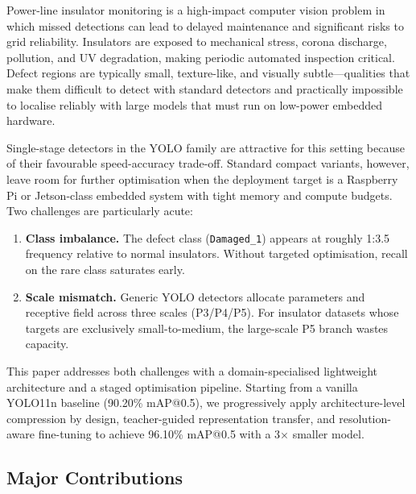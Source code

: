 \documentclass[11pt,a4paper]{article}
\begin{document}
Power-line insulator monitoring is a high-impact computer vision problem in which missed
detections can lead to delayed maintenance and significant risks to grid reliability.
Insulators are exposed to mechanical stress, corona discharge, pollution, and UV
degradation, making periodic automated inspection critical. Defect regions are typically
small, texture-like, and visually subtle---qualities that make them difficult to detect
with standard detectors and practically impossible to localise reliably with large models
that must run on low-power embedded hardware.

Single-stage detectors in the YOLO family are attractive for this setting because of their
favourable speed-accuracy trade-off. Standard compact variants, however, leave room for
further optimisation when the deployment target is a Raspberry Pi or Jetson-class embedded
system with tight memory and compute budgets. Two challenges are particularly acute:

\begin{enumerate}[leftmargin=2em]
  \item \textbf{Class imbalance.} The defect class (\texttt{Damaged\_1}) appears at
    roughly 1:3.5 frequency relative to normal insulators. Without targeted optimisation,
    recall on the rare class saturates early.
  \item \textbf{Scale mismatch.} Generic YOLO detectors allocate parameters and
    receptive field across three scales (P3/P4/P5). For insulator datasets whose targets
    are exclusively small-to-medium, the large-scale P5 branch wastes capacity.
\end{enumerate}

This paper addresses both challenges with a domain-specialised lightweight architecture
and a staged optimisation pipeline. Starting from a vanilla YOLO11n baseline (90.20\%
mAP@0.5), we progressively apply architecture-level compression by design, teacher-guided
representation transfer, and resolution-aware fine-tuning to achieve 96.10\% mAP@0.5 with
a 3$\times$ smaller model.

\subsection*{Major Contributions}
\end{document}
